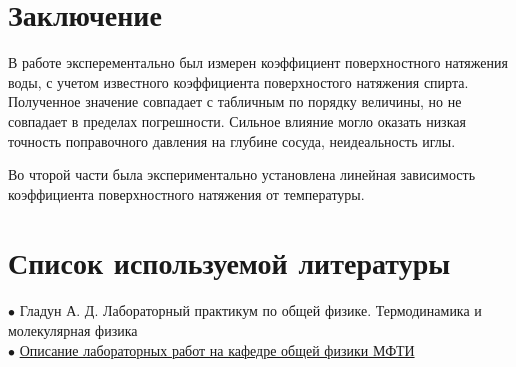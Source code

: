 \documentclass[a4paper, 12pt]{article} %
\begin{document}
\section{Заключение}

В работе эксперементально был измерен коэффициент поверхностного натяжения воды, с учетом известного коэффициента поверхностого натяжения спирта. Полученное значение совпадает с табличным по порядку величины, но не совпадает в пределах погрешности. Сильное влияние могло оказать низкая точность поправочного давления на глубине сосуда, неидеальность иглы.

Во чторой части была экспериментально установлена линейная зависимость коэффициента поверхностного натяжения от температуры.

\section{Список используемой литературы}

$\bullet$ Гладун А. Д. Лабораторный практикум по общей физике. Термодинамика и молекулярная физика\\

$\bullet$ \href{https://mipt.ru/education/chair/physics/S_II/lab/}{Описание лабораторных работ на кафедре общей физики МФТИ}
\end{document}
